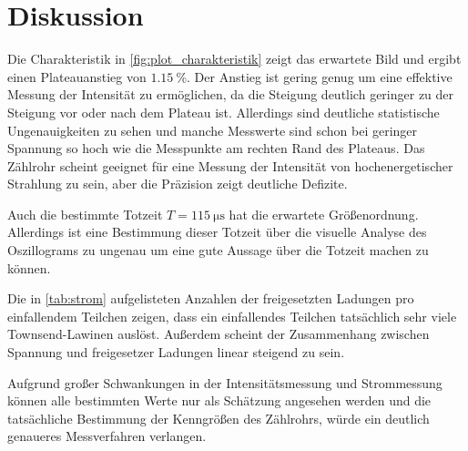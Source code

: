 \section{Diskussion}
\label{sec:Diskussion}

Die Charakteristik in \autoref{fig:plot_charakteristik} zeigt das erwartete Bild und ergibt einen Plateauanstieg von $\SI{1.15}{\percent}$.
Der Anstieg ist gering genug um eine effektive Messung der Intensität zu ermöglichen, da die Steigung deutlich geringer zu der Steigung vor oder nach dem Plateau ist.
Allerdings sind deutliche statistische Ungenauigkeiten zu sehen und manche Messwerte sind schon bei geringer Spannung so hoch wie die Messpunkte am rechten Rand des Plateaus.
Das Zählrohr scheint geeignet für eine Messung der Intensität von hochenergetischer Strahlung zu sein, aber die Präzision zeigt deutliche Defizite.

Auch die bestimmte Totzeit $T=\SI{115}{\micro\second}$ hat die erwartete Größenordnung.
Allerdings ist eine Bestimmung dieser Totzeit über die visuelle Analyse des Oszillograms zu ungenau um eine gute Aussage über die Totzeit machen zu können.

Die in \autoref{tab:strom} aufgelisteten Anzahlen der freigesetzten Ladungen pro einfallendem Teilchen zeigen, dass ein einfallendes Teilchen tatsächlich sehr viele Townsend-Lawinen auslöst.
Außerdem scheint der Zusammenhang zwischen Spannung und freigesetzer Ladungen linear steigend zu sein.

Aufgrund großer Schwankungen in der Intensitätsmessung und Strommessung können alle bestimmten Werte nur als Schätzung angesehen werden und die tatsächliche Bestimmung der Kenngrößen des Zählrohrs, würde ein deutlich genaueres Messverfahren verlangen.